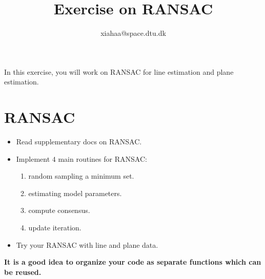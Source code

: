 \documentclass[a4paper]{article}
\begin{document}
\title{Exercise on RANSAC}
\author{xiahaa@space.dtu.dk}
\maketitle%

In this exercise, you will work on RANSAC for line estimation and plane estimation.

\section{RANSAC}
\begin{itemize}
\item Read supplementary docs on RANSAC.
\item Implement $4$ main routines for RANSAC: 
\begin{enumerate}
\item random sampling a minimum set.
\item estimating model parameters.
\item compute consensus.
\item update iteration.
\end{enumerate}
\item Try your RANSAC with line and plane data.
\end{itemize}

\textbf{It is a good idea to organize your code as separate functions which can be reused.}
\end{document}
